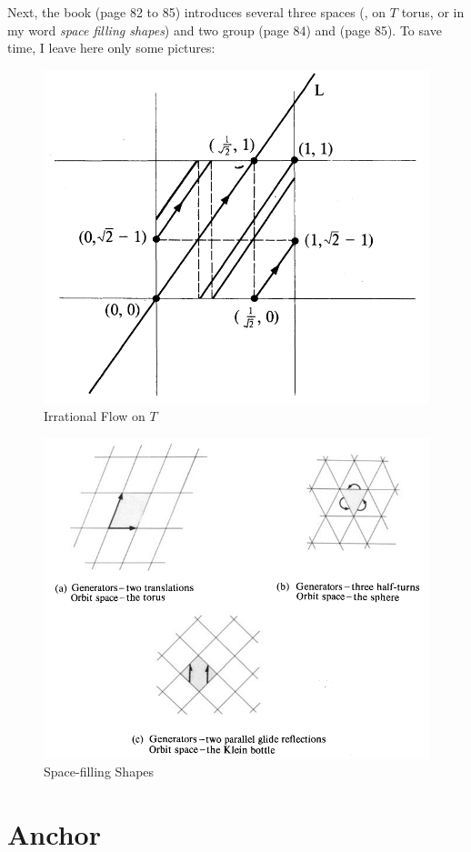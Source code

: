 \documentclass{article}
\begin{document}
Next, the book \cite{book} (page 82 to 85) introduces several three
spaces (,  on $T$ torus,
 or in my word \textit{space filling
shapes}) and two group  (page 84) and
 (page 85). To save time, I leave
here only some pictures:
\begin{figure}[H]
    \centering
    \includegraphics[width=0.8\linewidth]{pics/irrational-flow.png}
    \caption{Irrational Flow on $T$}
\end{figure}
\begin{figure}[H]
    \centering
    \includegraphics[width=0.8\linewidth]{pics/space-filling-shapes.png}
    \caption{Space-filling Shapes}
\end{figure}
\section{Anchor}
\label{sec:Anchor}
\end{document}
